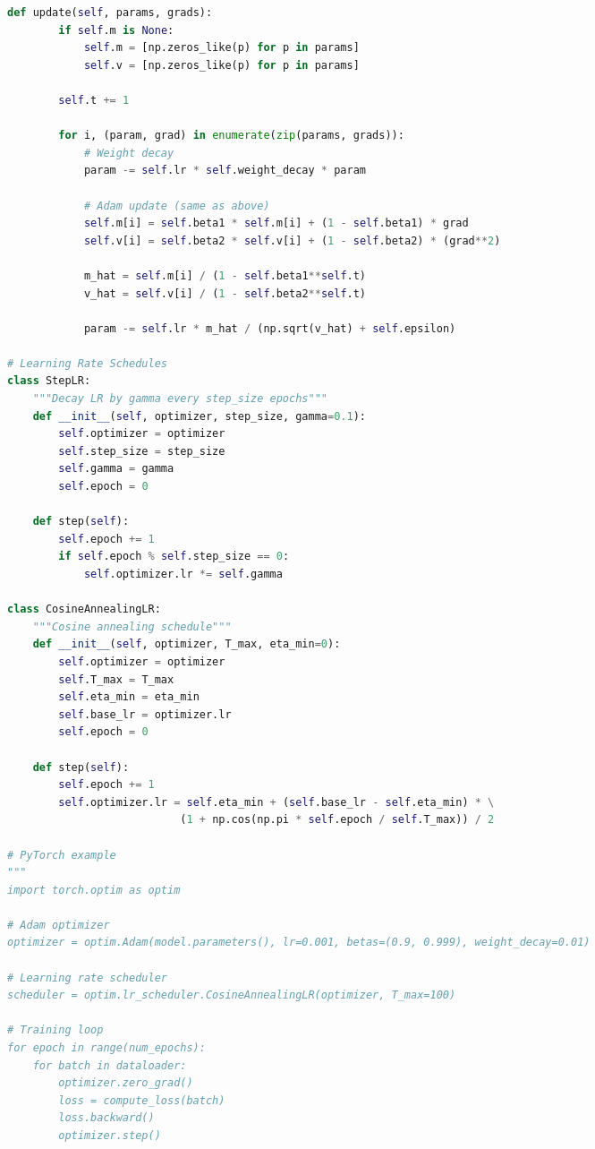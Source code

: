\documentclass[8pt,landscape]{article}
\begin{document}
\begin{multicols}{3}
\begin{lstlisting}[language=Python]
    def update(self, params, grads):
        if self.m is None:
            self.m = [np.zeros_like(p) for p in params]
            self.v = [np.zeros_like(p) for p in params]

        self.t += 1

        for i, (param, grad) in enumerate(zip(params, grads)):
            # Weight decay
            param -= self.lr * self.weight_decay * param

            # Adam update (same as above)
            self.m[i] = self.beta1 * self.m[i] + (1 - self.beta1) * grad
            self.v[i] = self.beta2 * self.v[i] + (1 - self.beta2) * (grad**2)

            m_hat = self.m[i] / (1 - self.beta1**self.t)
            v_hat = self.v[i] / (1 - self.beta2**self.t)

            param -= self.lr * m_hat / (np.sqrt(v_hat) + self.epsilon)

# Learning Rate Schedules
class StepLR:
    """Decay LR by gamma every step_size epochs"""
    def __init__(self, optimizer, step_size, gamma=0.1):
        self.optimizer = optimizer
        self.step_size = step_size
        self.gamma = gamma
        self.epoch = 0

    def step(self):
        self.epoch += 1
        if self.epoch % self.step_size == 0:
            self.optimizer.lr *= self.gamma

class CosineAnnealingLR:
    """Cosine annealing schedule"""
    def __init__(self, optimizer, T_max, eta_min=0):
        self.optimizer = optimizer
        self.T_max = T_max
        self.eta_min = eta_min
        self.base_lr = optimizer.lr
        self.epoch = 0

    def step(self):
        self.epoch += 1
        self.optimizer.lr = self.eta_min + (self.base_lr - self.eta_min) * \
                           (1 + np.cos(np.pi * self.epoch / self.T_max)) / 2

# PyTorch example
"""
import torch.optim as optim

# Adam optimizer
optimizer = optim.Adam(model.parameters(), lr=0.001, betas=(0.9, 0.999), weight_decay=0.01)

# Learning rate scheduler
scheduler = optim.lr_scheduler.CosineAnnealingLR(optimizer, T_max=100)

# Training loop
for epoch in range(num_epochs):
    for batch in dataloader:
        optimizer.zero_grad()
        loss = compute_loss(batch)
        loss.backward()
        optimizer.step()


\end{lstlisting}
\end{multicols}
\end{document}
